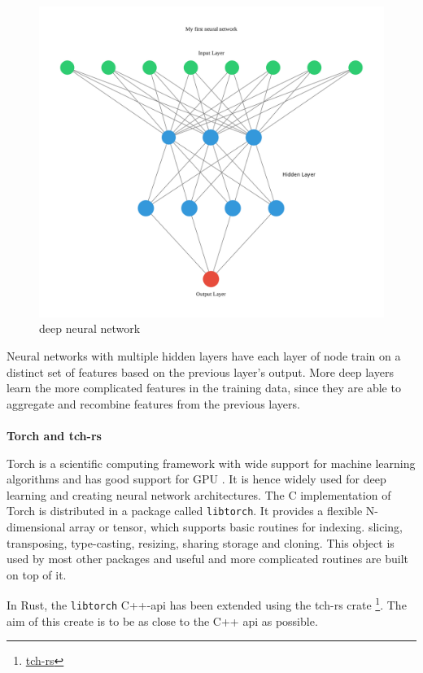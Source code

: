 \documentclass{book}
\begin{document}
\begin{figure}
	\centering
	\includegraphics[width=0.8\linewidth]{deep_neural_network.png}
	\caption{deep neural network}
	\label{fig:deep neural network}
\end{figure}

Neural networks with multiple hidden layers have each layer of node train on a distinct set of features based on the previous layer's output. More deep layers learn the more complicated features in the training data, since they are able to aggregate and recombine features from the previous layers.

\paragraph{}%
\textbf{Torch and tch-rs}

Torch is a scientific computing framework with wide support for machine learning algorithms and has good support for GPU\cite{WEBSITE:15} . It is hence widely used for deep learning and creating neural network architectures. The C implementation of Torch is distributed in a package called \lstinline{libtorch}. It provides a flexible N-dimensional array or tensor, which supports basic routines for indexing. slicing, transposing, type-casting, resizing, sharing storage and cloning. This object is used by most other packages and useful and more complicated routines are built on top of it.

In Rust, the \lstinline{libtorch} C++-api has been extended using the tch-rs crate \footnote{\href{https://github.com/LaurentMazare/tch-rs}{tch-rs}}. The aim of this create is to be as close to the C++ api as possible.
\end{document}
